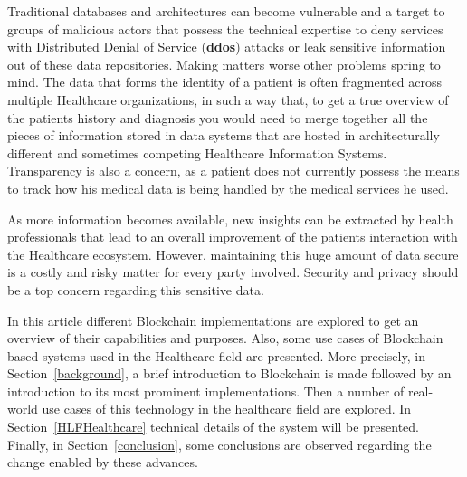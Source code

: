 Traditional databases and architectures can become vulnerable and a target to
groups of malicious actors that possess the technical expertise to deny
services with Distributed Denial of Service (\textbf{ddos}) attacks or leak
sensitive information out of these data repositories. Making matters worse
other problems spring to mind. The data that forms the identity of a patient is
often fragmented across multiple Healthcare organizations, in such a way that,
to get a true overview of the patients history and diagnosis you would need to
merge together all the pieces of information stored in data systems that are
hosted in architecturally different and sometimes competing Healthcare
Information Systems. Transparency is also a concern, as a patient does not
currently possess the means to track how his medical data is being handled by
the medical services he used.

As more information becomes available, new insights can be extracted by health
professionals that lead to an overall improvement of the patients interaction
with the Healthcare ecosystem. However, maintaining this huge amount of data
secure is a costly and risky matter for every party involved. Security and
privacy should be a top concern regarding this sensitive data. 

In this article different Blockchain implementations are explored to get an
overview of their capabilities and purposes. Also, some use cases of Blockchain
based systems used in the Healthcare field are presented. More precisely, in
Section~\ref{background}, a brief introduction to Blockchain is made followed
by an introduction to its most prominent implementations. Then a number of
real-world use cases of this technology in the healthcare field are explored.
In Section~\ref{HLFHealthcare} technical details of the system will be
presented. Finally, in Section~\ref{conclusion}, some conclusions are observed
regarding the change enabled by these advances.
